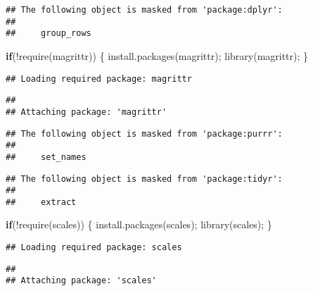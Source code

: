 \documentclass[
]{article}
\newenvironment{Shaded}{\begin{snugshade}}{\end{snugshade}}
\newcommand{\ControlFlowTok}[1]{\textcolor[rgb]{0.13,0.29,0.53}{\textbf{#1}}}
\newcommand{\FunctionTok}[1]{\textcolor[rgb]{0.00,0.00,0.00}{#1}}
\newcommand{\NormalTok}[1]{#1}
\newcommand{\SpecialCharTok}[1]{\textcolor[rgb]{0.00,0.00,0.00}{#1}}
\newcommand{\StringTok}[1]{\textcolor[rgb]{0.31,0.60,0.02}{#1}}
\begin{document}
\begin{verbatim}
## The following object is masked from 'package:dplyr':
## 
##     group_rows
\end{verbatim}

\begin{Shaded}
\begin{Highlighting}[]
\ControlFlowTok{if}\NormalTok{(}\SpecialCharTok{!}\FunctionTok{require}\NormalTok{(}\StringTok{\textquotesingle{}magrittr\textquotesingle{}}\NormalTok{))}
\NormalTok{\{}
  \FunctionTok{install.packages}\NormalTok{(}\StringTok{\textquotesingle{}magrittr\textquotesingle{}}\NormalTok{);}
  \FunctionTok{library}\NormalTok{(magrittr);}
\NormalTok{\}}
\end{Highlighting}
\end{Shaded}

\begin{verbatim}
## Loading required package: magrittr
\end{verbatim}

\begin{verbatim}
## 
## Attaching package: 'magrittr'
\end{verbatim}

\begin{verbatim}
## The following object is masked from 'package:purrr':
## 
##     set_names
\end{verbatim}

\begin{verbatim}
## The following object is masked from 'package:tidyr':
## 
##     extract
\end{verbatim}

\begin{Shaded}
\begin{Highlighting}[]
\ControlFlowTok{if}\NormalTok{(}\SpecialCharTok{!}\FunctionTok{require}\NormalTok{(}\StringTok{\textquotesingle{}scales\textquotesingle{}}\NormalTok{))}
\NormalTok{\{}
  \FunctionTok{install.packages}\NormalTok{(}\StringTok{\textquotesingle{}scales\textquotesingle{}}\NormalTok{);}
  \FunctionTok{library}\NormalTok{(scales);}
\NormalTok{\}}
\end{Highlighting}
\end{Shaded}

\begin{verbatim}
## Loading required package: scales
\end{verbatim}

\begin{verbatim}
## 
## Attaching package: 'scales'
\end{verbatim}
\end{document}
